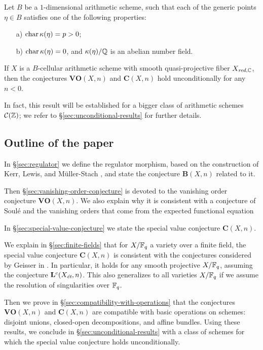 \documentclass{article}
\numberwithin{equation}{section}
\begin{document}
\begin{maintheorem*}
  Let $B$ be a $1$-dimensional arithmetic scheme, such that each of the generic
  points $\eta \in B$ satisfies one of the following properties:
  \begin{enumerate}
  \item[a)] $\fchar \kappa (\eta) = p > 0$;

  \item[b)] $\fchar \kappa (\eta) = 0$, and $\kappa (\eta)/\QQ$ is an abelian
    number field.
  \end{enumerate}
  If $X$ is a $B$-cellular arithmetic scheme with smooth quasi-projective fiber
  $X_{\red,\CC}$, then the conjectures $\mathbf{VO} (X,n)$ and
  $\mathbf{C} (X,n)$ hold unconditionally for any $n < 0$.
\end{maintheorem*}

In fact, this result will be established for a bigger class of arithmetic
schemes $\mathcal{C} (\ZZ)$; we refer to \S\ref{sec:unconditional-results} for
further details.

\subsection*{Outline of the paper}

In \S\ref{sec:regulator} we define the regulator morphism, based on the
construction of Kerr, Lewis, and Müller-Stach
\cite{Kerr-Lewis-Muller-Stach-2006}, and state the conjecture $\mathbf{B} (X,n)$
related to it.

Then \S\ref{sec:vanishing-order-conjecture} is devoted to the vanishing order
conjecture $\mathbf{VO} (X,n)$. We also explain why it is consistent with a
conjecture of Soulé and the vanishing orders that come from the expected
functional equation

In \S\ref{sec:special-value-conjecture} we state the special value conjecture
$\mathbf{C} (X,n)$.

We explain in \S\ref{sec:finite-fields} that for $X/\FF_q$ a variety over a
finite field, the special value conjecture $\mathbf{C} (X,n)$ is consistent with
the conjectures considered by Geisser in
\cite{Geisser-2004,Geisser-2006,Geisser-2010-arithmetic-homology}.
In particular, it holds for any smooth projective $X/\FF_q$, assuming the
conjecture $\mathbf{L}^c (X_\et,n)$. This also generalizes to all varieties
$X/\FF_q$ if we assume the resolution of singularities over $\FF_q$.

Then we prove in \S\ref{sec:compatibility-with-operations} that the conjectures
$\mathbf{VO} (X,n)$ and $\mathbf{C} (X,n)$ are compatible with basic operations
on schemes: disjoint unions, closed-open decompositions, and affine
bundles. Using these results, we conclude in \S\ref{sec:unconditional-results}
with a class of schemes for which the special value conjecture holds
unconditionally.
\end{document}
